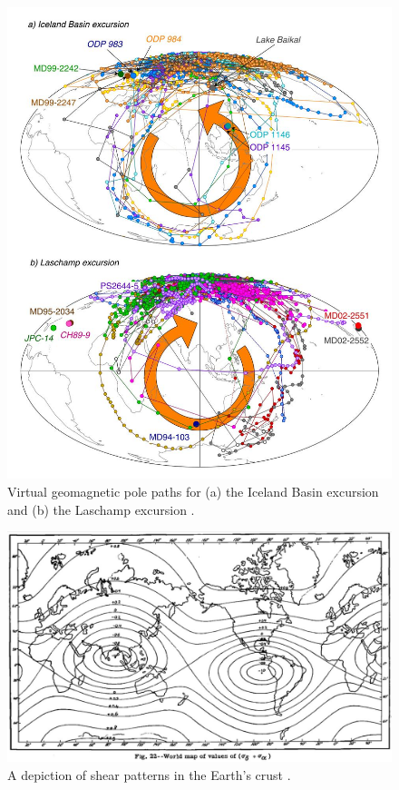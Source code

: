 \documentclass[10pt,twocolumn,letterpaper]{article}
\begin{document}
\begin{figure}[t]
\begin{center}
   \includegraphics[width=0.95\linewidth]{laj.jpg}
\end{center}
   \caption{Virtual geomagnetic pole paths for (a) the Iceland Basin excursion and (b) the Laschamp excursion \cite{35}.}
\label{fig:7}
\label{fig:onecol}
\end{figure}

\begin{figure}[t]
\begin{center}
   \includegraphics[width=1\linewidth]{meinesz3.jpg}
\end{center}
   \caption{A depiction of shear patterns in the Earth's crust \cite{36}.}
\label{fig:8}
\label{fig:onecol}
\end{figure}
\end{document}
